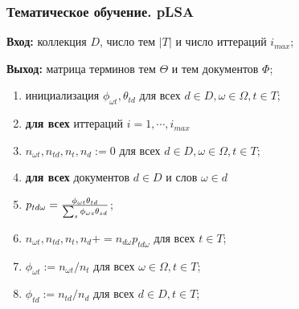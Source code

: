 \documentclass[notheorems, handout]{beamer}
\begin{document}
			\begin{frame}
	\frametitle{Тематическое обучение. pLSA}
	
\textbf{Вход:} коллекция $D$, число тем $|T|$ и число иттераций $i_{max}$;
	
\textbf{Выход:} матрица терминов тем $\Theta$ и тем документов $\Phi$;

\begin{enumerate}
		\item инициализация $\phi_{\omega t}, \theta_{td}$ для всех $d \in D, \omega \in \Omega, t \in T$; 
		\item \textbf{для всех} иттераций $i=1, \cdots, i_{max}$ 
		\item \quad $n_{\omega t}, n_{td}, n_t, n_d := 0$ для всех $d \in D, \omega \in \Omega, t \in T$; 
		\item \quad \textbf{для всех} документов  $d \in D$ и слов $\omega \in d$
		\item \quad \quad $p_{td\omega} = {{\phi_{\omega t} \theta_{td}} \over {\sum_{s} \phi_{\omega s} \theta_{sd}}}$; 
		\item \quad \quad $n_{\omega t}, n_{td}, n_t, n_d += n_{d \omega} p_{td \omega}$ для всех $t \in T$;
		\item \quad $\phi_{\omega t} := n_{\omega t}/n_t$ для всех $\omega \in \Omega, t \in T$;
		\item \quad $\phi_{td} := n_{td}/n_d$ для всех $d \in D, t \in T$;

\end{enumerate}
	\end{frame}
\end{document}
